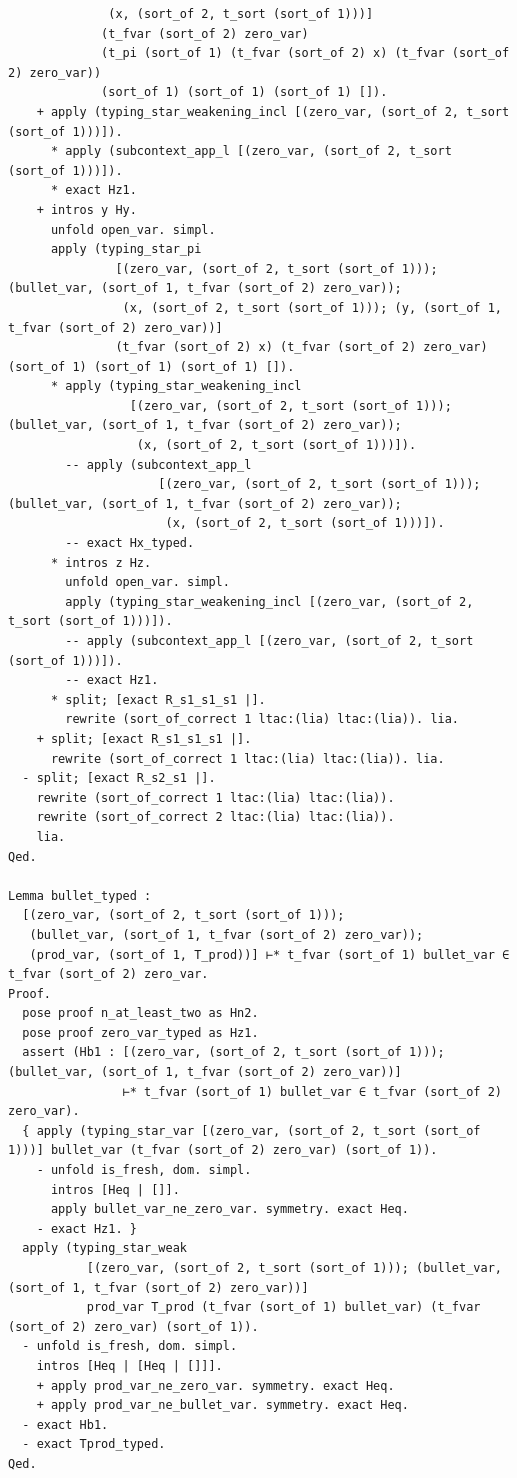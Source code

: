 \begin{latin}
\begin{verbatim}
              (x, (sort_of 2, t_sort (sort_of 1)))]
             (t_fvar (sort_of 2) zero_var)
             (t_pi (sort_of 1) (t_fvar (sort_of 2) x) (t_fvar (sort_of 2) zero_var))
             (sort_of 1) (sort_of 1) (sort_of 1) []).
    + apply (typing_star_weakening_incl [(zero_var, (sort_of 2, t_sort (sort_of 1)))]).
      * apply (subcontext_app_l [(zero_var, (sort_of 2, t_sort (sort_of 1)))]).
      * exact Hz1.
    + intros y Hy.
      unfold open_var. simpl.
      apply (typing_star_pi
               [(zero_var, (sort_of 2, t_sort (sort_of 1))); (bullet_var, (sort_of 1, t_fvar (sort_of 2) zero_var));
                (x, (sort_of 2, t_sort (sort_of 1))); (y, (sort_of 1, t_fvar (sort_of 2) zero_var))]
               (t_fvar (sort_of 2) x) (t_fvar (sort_of 2) zero_var) (sort_of 1) (sort_of 1) (sort_of 1) []).
      * apply (typing_star_weakening_incl
                 [(zero_var, (sort_of 2, t_sort (sort_of 1))); (bullet_var, (sort_of 1, t_fvar (sort_of 2) zero_var));
                  (x, (sort_of 2, t_sort (sort_of 1)))]).
        -- apply (subcontext_app_l
                     [(zero_var, (sort_of 2, t_sort (sort_of 1))); (bullet_var, (sort_of 1, t_fvar (sort_of 2) zero_var));
                      (x, (sort_of 2, t_sort (sort_of 1)))]).
        -- exact Hx_typed.
      * intros z Hz.
        unfold open_var. simpl.
        apply (typing_star_weakening_incl [(zero_var, (sort_of 2, t_sort (sort_of 1)))]).
        -- apply (subcontext_app_l [(zero_var, (sort_of 2, t_sort (sort_of 1)))]).
        -- exact Hz1.
      * split; [exact R_s1_s1_s1 |].
        rewrite (sort_of_correct 1 ltac:(lia) ltac:(lia)). lia.
    + split; [exact R_s1_s1_s1 |].
      rewrite (sort_of_correct 1 ltac:(lia) ltac:(lia)). lia.
  - split; [exact R_s2_s1 |].
    rewrite (sort_of_correct 1 ltac:(lia) ltac:(lia)).
    rewrite (sort_of_correct 2 ltac:(lia) ltac:(lia)).
    lia.
Qed.

Lemma bullet_typed :
  [(zero_var, (sort_of 2, t_sort (sort_of 1)));
   (bullet_var, (sort_of 1, t_fvar (sort_of 2) zero_var));
   (prod_var, (sort_of 1, T_prod))] ⊢* t_fvar (sort_of 1) bullet_var ∈ t_fvar (sort_of 2) zero_var.
Proof.
  pose proof n_at_least_two as Hn2.
  pose proof zero_var_typed as Hz1.
  assert (Hb1 : [(zero_var, (sort_of 2, t_sort (sort_of 1))); (bullet_var, (sort_of 1, t_fvar (sort_of 2) zero_var))]
                ⊢* t_fvar (sort_of 1) bullet_var ∈ t_fvar (sort_of 2) zero_var).
  { apply (typing_star_var [(zero_var, (sort_of 2, t_sort (sort_of 1)))] bullet_var (t_fvar (sort_of 2) zero_var) (sort_of 1)).
    - unfold is_fresh, dom. simpl.
      intros [Heq | []].
      apply bullet_var_ne_zero_var. symmetry. exact Heq.
    - exact Hz1. }
  apply (typing_star_weak
           [(zero_var, (sort_of 2, t_sort (sort_of 1))); (bullet_var, (sort_of 1, t_fvar (sort_of 2) zero_var))]
           prod_var T_prod (t_fvar (sort_of 1) bullet_var) (t_fvar (sort_of 2) zero_var) (sort_of 1)).
  - unfold is_fresh, dom. simpl.
    intros [Heq | [Heq | []]].
    + apply prod_var_ne_zero_var. symmetry. exact Heq.
    + apply prod_var_ne_bullet_var. symmetry. exact Heq.
  - exact Hb1.
  - exact Tprod_typed.
Qed.


\end{verbatim}
\end{latin}
